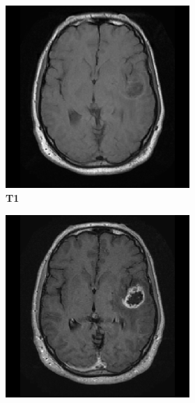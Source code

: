 \begin{subappendices}
\begin{figure}
    \centering
    \begin{subfigure}[b]{0.77\textwidth}
        \centering
        \begin{subfigure}[b]{0.24\textwidth}
        \includegraphics[width=\textwidth]{Figures/TCGA-06-0238_T1.png}
        \caption*{\normalfont \textbf{\acrshort{T1}}\nopunct}
        \end{subfigure}
        \hfill
        \begin{subfigure}[b]{0.24\textwidth}
        \includegraphics[width=\textwidth]{Figures/TCGA-06-0238_T1GD.png}

\end{subfigure}
\end{subfigure}
\end{figure}
\end{subappendices}
